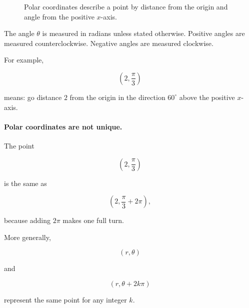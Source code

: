 \begin{figure}[h]
\centering
{}
\caption{Polar coordinates describe a point by distance from the origin and angle from the positive \(x\)-axis.}
\label{fig:polar-coordinate-point}
\end{figure}

The angle \(\theta\) is measured in radians unless stated otherwise.  Positive angles are
measured counterclockwise.  Negative angles are measured clockwise.

For example,

\[
\left(2,\frac{\pi}{3}\right)
\]

means: go distance \(2\) from the origin in the direction \(60^\circ\) above the positive
\(x\)-axis.

\paragraph{Polar coordinates are not unique.}
The point

\[
\left(2,\frac{\pi}{3}\right)
\]

is the same as

\[
\left(2,\frac{\pi}{3}+2\pi\right),
\]

because adding \(2\pi\) makes one full turn.

More generally,

\[
(r,\theta)
\]

and

\[
(r,\theta+2k\pi)
\]

represent the same point for any integer \(k\).

